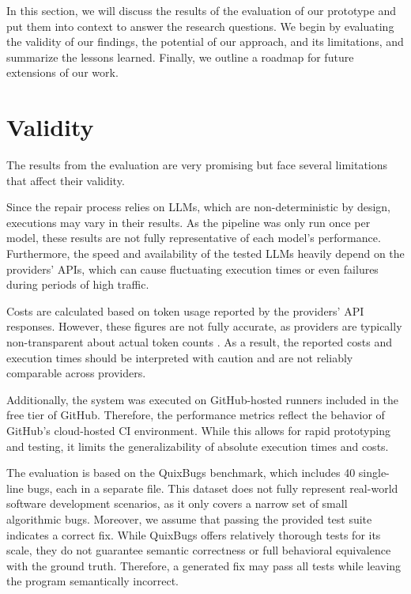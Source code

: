 In this section, we will discuss the results of the evaluation of our prototype and put them into context to answer the research questions. We begin by evaluating the validity of our findings, the potential of our approach, and its limitations, and summarize the lessons learned. Finally, we outline a roadmap for future extensions of our work.

\section{Validity} \label{section:validity}

The results from the evaluation are very promising but face several limitations that affect their validity.

Since the repair process relies on \acp{LLM}, which are non-deterministic by design, executions may vary in their results. As the pipeline was only run once per model, these results are not fully representative of each model's performance. Furthermore, the speed and availability of the tested \acp{LLM} heavily depend on the providers' APIs, which can cause fluctuating execution times or even failures during periods of high traffic.

Costs are calculated based on token usage reported by the providers' API responses. However, these figures are not fully accurate, as providers are typically non-transparent about actual token counts \cite{sunCoInCountingInvisible2025d}. As a result, the reported costs and execution times should be interpreted with caution and are not reliably comparable across providers.

Additionally, the system was executed on GitHub-hosted runners included in the free tier of GitHub. Therefore, the performance metrics reflect the behavior of GitHub's cloud-hosted CI environment. While this allows for rapid prototyping and testing, it limits the generalizability of absolute execution times and costs.

The evaluation is based on the QuixBugs benchmark, which includes 40 single-line bugs, each in a separate file. This dataset does not fully represent real-world software development scenarios, as it only covers a narrow set of small algorithmic bugs. Moreover, we assume that passing the provided test suite indicates a correct fix. While QuixBugs offers relatively thorough tests for its scale, they do not guarantee semantic correctness or full behavioral equivalence with the ground truth. Therefore, a generated fix may pass all tests while leaving the program semantically incorrect.


